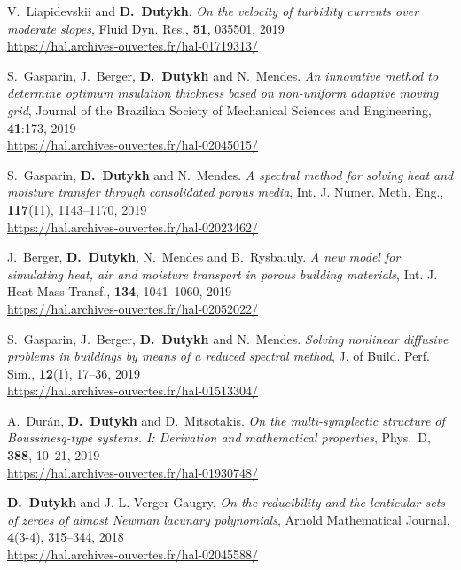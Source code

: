 \begin{etaremune}
  \item V.~Liapidevskii and \textbf{D.~Dutykh}. \textit{On the velocity of turbidity currents over moderate slopes}, Fluid Dyn. Res., \textbf{51}, 035501, 2019 \\ %
  \url{https://hal.archives-ouvertes.fr/hal-01719313/}
  
  \item S.~Gasparin, J.~Berger, \textbf{D.~Dutykh} and N.~Mendes. \textit{An innovative method to determine optimum insulation thickness based on non-uniform adaptive moving grid}, Journal of the Brazilian Society of Mechanical Sciences and Engineering, \textbf{41}:173, 2019 \\ %
  \url{https://hal.archives-ouvertes.fr/hal-02045015/}
  
  \item S.~Gasparin, \textbf{D.~Dutykh} and N.~Mendes. \textit{A spectral method for solving heat and moisture transfer through consolidated porous media}, Int. J. Numer. Meth. Eng., \textbf{117}(11), 1143--1170, 2019 \\ %
  \url{https://hal.archives-ouvertes.fr/hal-02023462/}
  
  \item J.~Berger, \textbf{D.~Dutykh}, N.~Mendes and B.~Rysbaiuly. \textit{A new model for simulating heat, air and moisture transport in porous building materials}, Int. J. Heat Mass Transf., \textbf{134}, 1041--1060, 2019 \\ %
  \url{https://hal.archives-ouvertes.fr/hal-02052022/}
  
  \item S.~Gasparin, J.~Berger, \textbf{D.~Dutykh} and N.~Mendes. \textit{Solving nonlinear diffusive problems in buildings by means of a reduced spectral method}, J. of Build. Perf. Sim., \textbf{12}(1), 17--36, 2019 \\ %
  \url{https://hal.archives-ouvertes.fr/hal-01513304/}
  
  \item A.~Dur\'an, \textbf{D.~Dutykh} and D.~Mitsotakis. \textit{On the multi-symplectic structure of Boussinesq-type systems. I: Derivation and mathematical properties}, Phys.~D, \textbf{388}, 10--21, 2019 \\ %
  \url{https://hal.archives-ouvertes.fr/hal-01930748/}

  
  \item \textbf{D.~Dutykh} and J.-L. Verger-Gaugry. \textit{On the reducibility and the lenticular sets of zeroes of almost Newman lacunary polynomials}, Arnold Mathematical Journal, \textbf{4}(3-4), 315--344, 2018 \\ %
  \url{https://hal.archives-ouvertes.fr/hal-02045588/}
  

\end{etaremune}
